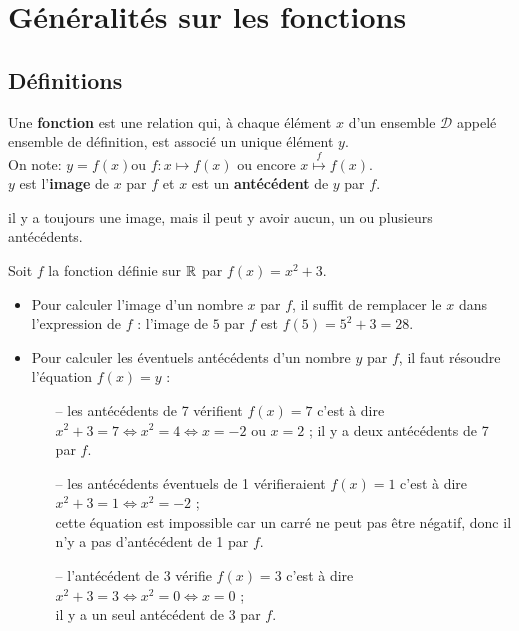 \cours %

\section{Généralités sur les fonctions} %

\subsection{Définitions} %

\begin{definition}
   Une \textbf{fonction} est une relation qui, à chaque élément $x$ d'un ensemble $\mathcal{D}$ appelé ensemble de définition, est associé un unique élément $y$. \\
   On note: $y=f(x)$\quad ou \quad $f:x\mapsto f(x)$ \quad ou encore \quad $x \stackrel{f}{\mapsto} f(x)$. \\
   $y$ est l'\textbf{image} de $x$ par $f$ et $x$ est un \textbf{antécédent} de $y$ par $f$.
\end{definition}

\begin{remarque}
   il y a toujours une image, mais il peut y avoir aucun, un ou plusieurs antécédents.
\end{remarque}

\begin{exemple*1}
   Soit $f$ la fonction définie sur ${\mathbb R}$ par $f(x)=x^2+3$.
   \begin{itemize}
      \item Pour calculer l'image d'un nombre $x$ par $f$, il suffit de remplacer le \og $x$ \fg{} dans l'expression de $f$ : l'image de $5$ par $f$ est $f(5)=5^2+3=28$.
      \item Pour calculer les éventuels antécédents d'un nombre $y$ par $f$, il faut résoudre l'équation $f(x) =y$ :
      \begin{itemize}
         \item[--] les antécédents de 7 vérifient $f(x)=7$ c'est à dire $x^2+3=7 \iff x^2 =4 \iff x=-2$ ou $x=2$ ; il y a deux antécédents de 7 par $f$.
         \item[--] les antécédents éventuels de 1 vérifieraient $f(x)=1$ c'est à dire $x^2+3=1 \iff x^2 =-2$ ; \\
         cette équation est impossible car un carré ne peut pas être négatif, donc il n'y a pas d'antécédent de 1 par $f$.
         \item[--] l'antécédent de $3$ vérifie $f(x)=3$ c'est à dire $x^2+3=3 \iff x^2 =0 \iff x=0$ ; \\
         il y a un seul antécédent de $3$ par $f$.
      \end{itemize}
   \end{itemize}
\end{exemple*1}


